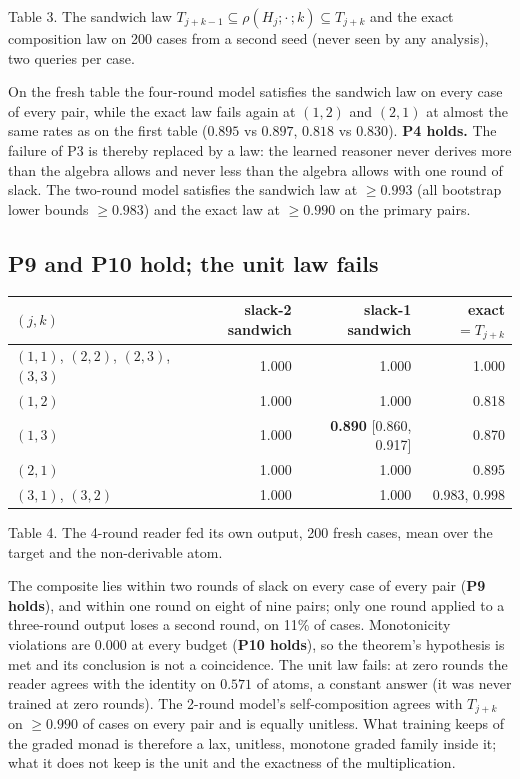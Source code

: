 Table 3. The sandwich law \(T_{j+k-1}\subseteq\rho(H_j;\cdot\,;k)\subseteq T_{j+k}\) and the exact composition law on 200 cases from a second seed (never seen by any analysis), two queries per case.

On the fresh table the four-round model satisfies the sandwich law on every case of every pair, while the exact law fails again at \((1,2)\) and \((2,1)\) at almost the same rates as on the first table (\(0.895\) vs \(0.897\), \(0.818\) vs \(0.830\)). \textbf{P4 holds.} The failure of P3 is thereby replaced by a law: the learned reasoner never derives more than the algebra allows and never less than the algebra allows with one round of slack. The two-round model satisfies the sandwich law at \(\ge0.993\) (all bootstrap lower bounds \(\ge0.983\)) and the exact law at \(\ge0.990\) on the primary pairs.

\subsection{P9 and P10 hold; the unit law fails}\label{p9-and-p10-hold-the-unit-law-fails}

{\def\LTcaptype{none} %
\begin{longtable}[]{@{}lrrr@{}}
\toprule\noalign{}
\((j,k)\) & slack-2 sandwich & slack-1 sandwich & exact \(=T_{j+k}\) \\
\midrule\noalign{}
\endhead
\bottomrule\noalign{}
\endlastfoot
\((1,1)\), \((2,2)\), \((2,3)\), \((3,3)\) & 1.000 & 1.000 & 1.000 \\
\((1,2)\) & 1.000 & 1.000 & 0.818 \\
\((1,3)\) & 1.000 & \textbf{0.890} {[}0.860, 0.917{]} & 0.870 \\
\((2,1)\) & 1.000 & 1.000 & 0.895 \\
\((3,1)\), \((3,2)\) & 1.000 & 1.000 & 0.983, 0.998 \\
\end{longtable}
}

Table 4. The 4-round reader fed its own output, 200 fresh cases, mean over the target and the non-derivable atom.

The composite lies within two rounds of slack on every case of every pair (\textbf{P9 holds}), and within one round on eight of nine pairs; only one round applied to a three-round output loses a second round, on 11\% of cases. Monotonicity violations are \(0.000\) at every budget (\textbf{P10 holds}), so the theorem's hypothesis is met and its conclusion is not a coincidence. The unit law fails: at zero rounds the reader agrees with the identity on \(0.571\) of atoms, a constant answer (it was never trained at zero rounds). The 2-round model's self-composition agrees with \(T_{j+k}\) on \(\ge0.990\) of cases on every pair and is equally unitless. What training keeps of the graded monad is therefore a lax, unitless, monotone graded family inside it; what it does not keep is the unit and the exactness of the multiplication.


